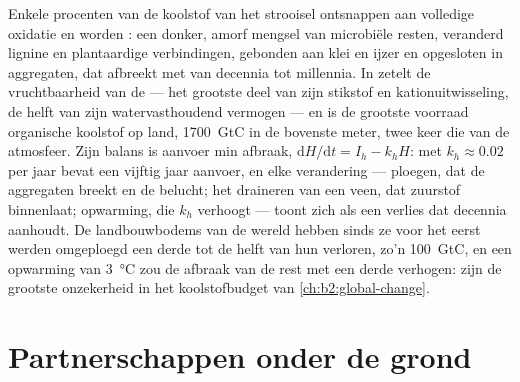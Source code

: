 \begin{proposition}\label{prop:b2:living-soil:humus}
Enkele procenten van de koolstof van het strooisel ontsnappen aan volledige
oxidatie en worden \emph{}: een donker, amorf mengsel van microbiële
resten, veranderd lignine en plantaardige verbindingen, gebonden aan klei en
ijzer en opgesloten in aggregaten, dat afbreekt met  van
decennia tot millennia. In  zetelt de vruchtbaarheid van de 
--- het grootste deel van zijn stikstof en kationuitwisseling, de helft van zijn
watervasthoudend vermogen --- en  is de grootste voorraad organische
koolstof op land, \qty{1700}{GtC} in de bovenste meter, twee keer die van de
atmosfeer. Zijn balans is aanvoer min afbraak, $\mathrm{d}H/\mathrm{d}t = I_h - k_hH$:
met $k_h \approx 0.02$ per jaar bevat een  vijftig jaar aanvoer,
en elke verandering --- ploegen, dat de aggregaten breekt en de  belucht;
het draineren van een veen, dat zuurstof binnenlaat; opwarming, die $k_h$
verhoogt --- toont zich als een verlies dat decennia aanhoudt. De
landbouwbodems van de wereld hebben sinds ze voor het eerst werden omgeploegd
een derde tot de helft van hun  verloren, zo'n
\qty{100}{GtC}, en een opwarming van \qty{3}{\celsius} zou de afbraak van de
rest met een derde verhogen:  zijn de grootste onzekerheid in het
koolstofbudget van \cref{ch:b2:global-change}.
\end{proposition}

\section{Partnerschappen onder de grond}

